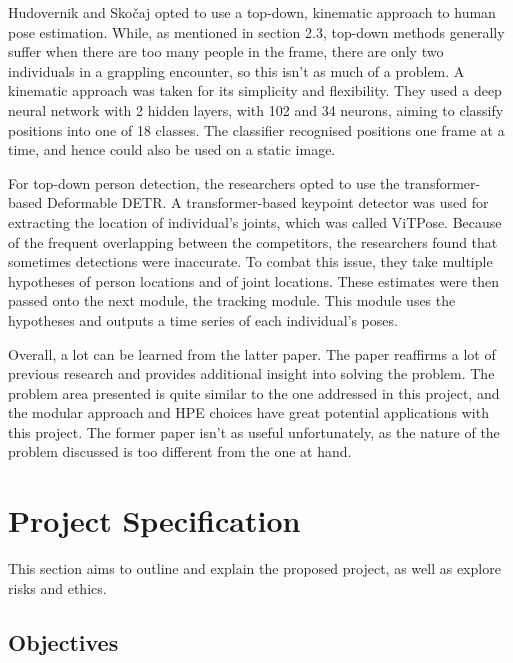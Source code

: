 \documentclass[a4paper, oneside, 11pt]{article}
\begin{document}
Hudovernik and Skočaj opted to use a top-down, kinematic approach to human pose estimation. While, as mentioned in section 2.3, top-down methods generally suffer when there are too many people in the frame, there are only two individuals in a grappling encounter, so this isn't as much of a problem. A kinematic approach was taken for its simplicity and flexibility. They used a deep neural network with 2 hidden layers, with 102 and 34 neurons, aiming to classify positions into one of 18 classes. The classifier recognised positions one frame at a time, and hence could also be used on a static image.

For top-down person detection, the researchers opted to use the transformer-based Deformable DETR. A transformer-based keypoint detector was used for extracting the location of individual's joints, which was called ViTPose. Because of the frequent overlapping between the competitors, the researchers found that sometimes detections were inaccurate. To combat this issue, they take multiple hypotheses of person locations and of joint locations. These estimates were then passed onto the next module, the tracking module. This module uses the hypotheses and outputs a time series of each individual's poses.

Overall, a lot can be learned from the latter paper. The paper reaffirms a lot of previous research and provides additional insight into solving the problem. The problem area presented is quite similar to the one addressed in this project, and the modular approach and HPE choices have great potential applications with this project. The former paper isn't as useful unfortunately, as the nature of the problem discussed is too different from the one at hand.





\section{Project Specification}
This section aims to outline and explain the proposed project, as well as explore risks and ethics.

\subsection{Objectives}
\end{document}
